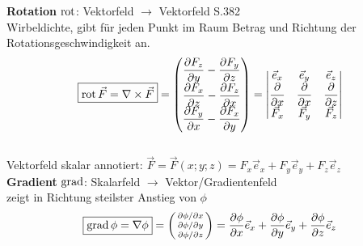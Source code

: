 \textbf{Rotation} $\operatorname{rot}$: Vektorfeld $\rightarrow$ Vektorfeld \qquad S.382\\ 
\small{Wirbeldichte, gibt für jeden Punkt im Raum Betrag und Richtung der Rotationsgeschwindigkeit an.}
\begin{align*}
\boxed{\operatorname{rot} \vec{F} = \nabla \times \vec{F} } = 
\begin{pmatrix}
    \dfrac{\partial F_z}{\partial y} - \dfrac{\partial F_y}{\partial z} \\
    \dfrac{\partial F_x}{\partial z} - \dfrac{\partial F_z}{\partial x} \\
    \dfrac{\partial F_y}{\partial x} - \dfrac{\partial F_x}{\partial y}
\end{pmatrix} =
\begin{vmatrix}
    \vec{e}_x & \vec{e}_y & \vec{e}_z \\
    \dfrac{\partial}{\partial x} & \dfrac{\partial }{\partial x} & \dfrac{\partial }{\partial z} \\
    \vec{F}_x & \vec{F}_y & \vec{F}_z
\end{vmatrix}
\end{align*}\\
Vektorfeld skalar annotiert: $\vec{F} = \vec{F}(x;y;z) = F_x\vec{e}_x+F_y\vec{e}_y+F_z\vec{e}_z$\\

\textbf{Gradient} $\operatorname{grad}$: Skalarfeld $\rightarrow$ Vektor/Gradientenfeld\\ 
\small{zeigt in Richtung steilster Anstieg von $\phi$}
\begin{align*}                                                                                          
    \boxed{\operatorname{grad} \phi = \nabla \phi }=  
    \begin{psmallmatrix}
        \partial \phi / \partial x \\
        \partial \phi / \partial y \\
        \partial \phi / \partial z
    \end{psmallmatrix}
    = \dfrac{\partial \phi}{\partial x} \vec{e}_x + \dfrac{\partial \phi}{\partial y} \vec{e}_y + 
    \dfrac{\partial \phi}{\partial z} \vec{e}_z  
\end{align*}

